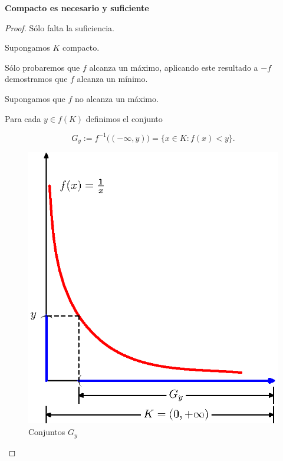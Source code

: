 \documentclass[a4,portrait]{seminar}
\newtheorem{thm}{Teorema}
\begin{document}
\begin{slide*}

\begin{center}
{\large \textbf{Compacto es necesario y suficiente}}
\end{center}



\begin{proof} S\'olo falta la suficiencia.

Supongamos $K$ compacto.



S\'olo probaremos   que $f$ alcanza un m\'aximo, aplicando este
resultado a $-f$ demostramos que $f$ alcanza un m\'inimo.


Supongamos que $f$ no alcanza un m\'aximo.

Para cada $y\in f(K)$ definimos el conjunto

\[
    G_y:=f^{-1}\bigl((-\infty,y)\bigr)=\{x\in K:f(x)<y\}.
\]

\begin{center}
\begin{figure}[h]
\setlength{\unitlength}{46mm}
\includegraphics[height=1\unitlength,width=0.98\unitlength]{figura1.eps}
\caption{Conjuntos $G_y$}\label{figura1}
\end{figure}
\end{center}


\end{proof}
\end{slide*}
\end{document}
